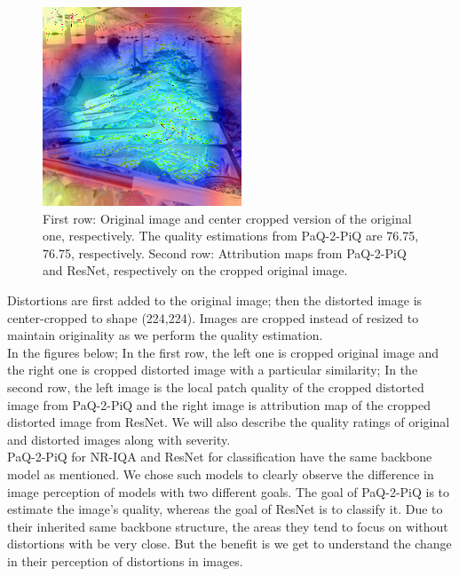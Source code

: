 \documentclass[10pt,twocolumn,letterpaper]{article}
\begin{document}
\begin{figure}[!ht]
    \includegraphics[width=.49\columnwidth]{Images/saliency_maps/resnet18/severity=0/buffet.png}\hfill
    \caption{First row: Original image and center cropped version of the original one, respectively. The quality estimations from PaQ-2-PiQ are 76.75, 76.75, respectively. Second row: Attribution maps from PaQ-2-PiQ and ResNet, respectively on the cropped original image.}
\end{figure}

Distortions are first added to the original image; then the distorted image is center-cropped to shape (224,224). Images are cropped instead of resized to maintain originality as we perform the quality estimation.\\

In the figures below; In the first row, the left one is cropped original image and the right one is cropped distorted image with a particular similarity; In the second row, the left image is the local patch quality of the cropped distorted image from PaQ-2-PiQ and the right image is attribution map of the cropped distorted image from ResNet. We will also describe the quality ratings of original and distorted images along with severity.\\

PaQ-2-PiQ for NR-IQA and ResNet for classification have the same backbone model as mentioned. We chose such models to clearly observe the difference in image perception of models with two different goals. The goal of PaQ-2-PiQ is to estimate the image's quality, whereas the goal of ResNet is to classify it. Due to their inherited same backbone structure, the areas they tend to focus on without distortions with be very close. But the benefit is we get to understand the change in their perception of distortions in images.
\end{document}
